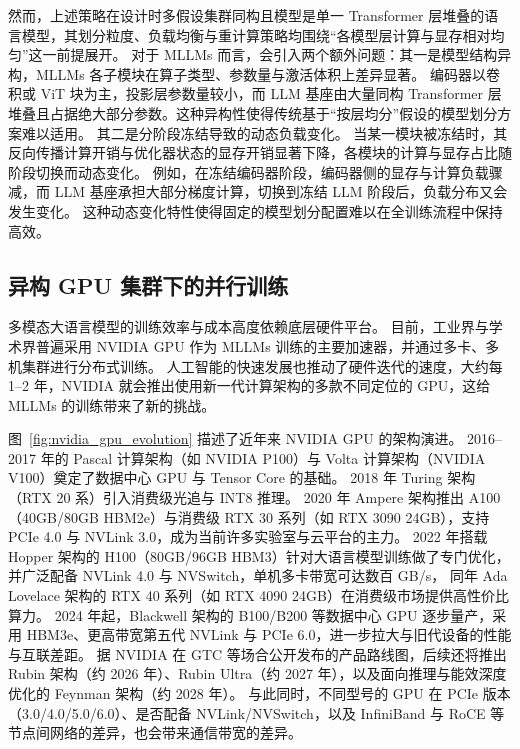 然而，上述策略在设计时多假设集群同构且模型是单一 Transformer 层堆叠的语言模型，其划分粒度、负载均衡与重计算策略均围绕“各模型层计算与显存相对均匀”这一前提展开。
对于 MLLMs 而言，会引入两个额外问题：其一是模型结构异构，MLLMs 各子模块在算子类型、参数量与激活体积上差异显著。
编码器以卷积或 ViT 块为主，投影层参数量较小，而 LLM 基座由大量同构 Transformer 层堆叠且占据绝大部分参数。这种异构性使得传统基于“按层均分”假设的模型划分方案难以适用。
其二是分阶段冻结导致的动态负载变化。
当某一模块被冻结时，其反向传播计算开销与优化器状态的显存开销显著下降，各模块的计算与显存占比随阶段切换而动态变化。
例如，在冻结编码器阶段，编码器侧的显存与计算负载骤减，而 LLM 基座承担大部分梯度计算，切换到冻结 LLM 阶段后，负载分布又会发生变化。
这种动态变化特性使得固定的模型划分配置难以在全训练流程中保持高效。

\subsection{异构 GPU 集群下的并行训练}

多模态大语言模型的训练效率与成本高度依赖底层硬件平台。
目前，工业界与学术界普遍采用 NVIDIA GPU 作为 MLLMs 训练的主要加速器，并通过多卡、多机集群进行分布式训练。
人工智能的快速发展也推动了硬件迭代的速度，大约每 1--2 年，NVIDIA 就会推出使用新一代计算架构的多款不同定位的 GPU，这给 MLLMs 的训练带来了新的挑战。

图~\ref{fig:nvidia_gpu_evolution} 描述了近年来 NVIDIA GPU 的架构演进。
2016--2017 年的 Pascal 计算架构（如 NVIDIA P100）与 Volta 计算架构（NVIDIA V100）奠定了数据中心 GPU 与 Tensor Core 的基础。
2018 年 Turing 架构（RTX 20 系）引入消费级光追与 INT8 推理。
2020 年 Ampere 架构推出 A100（40GB/80GB HBM2e）与消费级 RTX 30 系列（如 RTX 3090 24GB），支持 PCIe 4.0 与 NVLink 3.0，成为当前许多实验室与云平台的主力\cite{nvidia_a100}。
2022 年搭载 Hopper 架构的 H100（80GB/96GB HBM3）针对大语言模型训练做了专门优化\cite{nvidia_h100}，并广泛配备 NVLink 4.0 与 NVSwitch，单机多卡带宽可达数百 GB/s，
同年 Ada Lovelace 架构的 RTX 40 系列（如 RTX 4090 24GB）在消费级市场提供高性价比算力。
2024 年起，Blackwell 架构的 B100/B200 等数据中心 GPU 逐步量产，采用 HBM3e、更高带宽第五代 NVLink 与 PCIe 6.0，进一步拉大与旧代设备的性能与互联差距。
据 NVIDIA 在 GTC 等场合公开发布的产品路线图\cite{nvidia_blackwell}，后续还将推出 Rubin 架构（约 2026 年）、Rubin Ultra（约 2027 年），以及面向推理与能效深度优化的 Feynman 架构（约 2028 年）。
与此同时，不同型号的 GPU 在 PCIe 版本（3.0/4.0/5.0/6.0）、是否配备 NVLink/NVSwitch，以及 InfiniBand 与 RoCE 等节点间网络的差异，也会带来通信带宽的差异。

